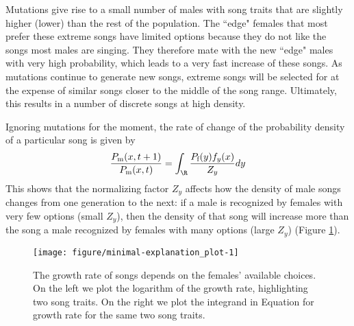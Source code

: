 \documentclass{article}\usepackage[]{graphicx}\usepackage[]{color}
\makeatletter
\def\maxwidth{ %
  \ifdim\Gin@nat@width>\linewidth
    \linewidth
  \else
    \Gin@nat@width
  \fi
}
\newenvironment{knitrout}{}{} %
\makeatother
\begin{document}
Mutations give rise to a small number of males with song traits that are slightly higher (lower) than the rest of the population. The ``edge" females that most prefer these extreme songs have limited options because they do not like the songs most males are singing. They therefore mate with the new ``edge" males with very high probability, which leads to a very fast increase of these songs. As mutations continue to generate new songs, extreme songs will be selected for at the expense of similar songs closer to the middle of the song range. Ultimately, this results in a number of discrete songs at high density.

Ignoring mutations for the moment, the rate of change of the probability density of a particular song is given by 
\begin{equation}
\frac{P_\text{m}(x,t+1)}{P_\text{m}(x,t)}= \int _\R\frac{ P_\text{f}(y)f_y(x)}{Z_y}dy \label{growth}
\end{equation}
This shows that the normalizing factor $Z_y$ affects how the density of male songs changes from one generation to the next: if a male is recognized by females with very few options (small $Z_y$), then the density of that song will increase more than the song a male recognized by females with many options (large $Z_y$) (Figure \ref{fig:explanation_plot}).



\begin{knitrout}\footnotesize
{}\color{fgcolor}\begin{figure}

{\centering \texttt{[image: figure/minimal-explanation\_plot-1]} 

}

\caption[The growth rate of songs depends on the females' available choices]{The growth rate of songs depends on the females' available choices. On the left we plot the logarithm of the growth rate, highlighting two song traits. On the right we plot the integrand in Equation for growth rate for the same two song traits.}\label{fig:explanation_plot}
\end{figure}


\end{knitrout}
\end{document}
